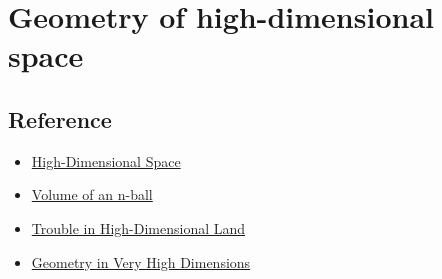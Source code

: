 \chapter{Geometry of high-dimensional space}

\section{Reference}

\begin{itemize}
    \item \href{https://www.cs.cmu.edu/~venkatg/teaching/CStheory-infoage/chap1-high-dim-space.pdf}{High-Dimensional Space}
    \item \href{https://en.wikipedia.org/wiki/Volume_of_an_n-ball}{Volume of an n-ball}
    \item \href{https://dibyaghosh.com/blog/probability/highdimensionalgeometry.html}{Trouble in High-Dimensional Land}
    \item \href{https://www.math.wustl.edu/~feres/highdim}{Geometry in Very High Dimensions}
\end{itemize}
